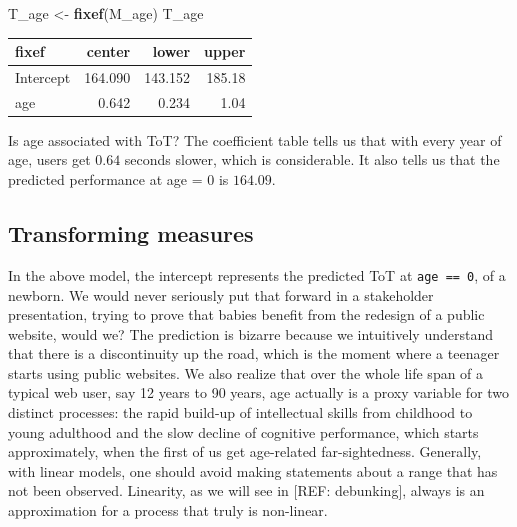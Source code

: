 \documentclass[]{svmono}
\newenvironment{Shaded}{\begin{snugshade}}{\end{snugshade}}
\newcommand{\KeywordTok}[1]{\textcolor[rgb]{0.13,0.29,0.53}{\textbf{#1}}}
\newcommand{\DataTypeTok}[1]{\textcolor[rgb]{0.13,0.29,0.53}{#1}}
\newcommand{\DecValTok}[1]{\textcolor[rgb]{0.00,0.00,0.81}{#1}}
\newcommand{\StringTok}[1]{\textcolor[rgb]{0.31,0.60,0.02}{#1}}
\newcommand{\OperatorTok}[1]{\textcolor[rgb]{0.81,0.36,0.00}{\textbf{#1}}}
\newcommand{\NormalTok}[1]{#1}
\begin{document}
\begin{Shaded}
\end{Shaded}

\begin{Shaded}
\begin{Highlighting}[]
\NormalTok{T_age <-}\StringTok{ }\KeywordTok{fixef}\NormalTok{(M_age)}
\NormalTok{T_age}
\end{Highlighting}
\end{Shaded}

\begin{longtable}[]{@{}lrrr@{}}
\toprule
fixef & center & lower & upper\tabularnewline
\midrule
\endhead
Intercept & 164.090 & 143.152 & 185.18\tabularnewline
age & 0.642 & 0.234 & 1.04\tabularnewline
\bottomrule
\end{longtable}

Is age associated with ToT? The coefficient table tells us that with
every year of age, users get \(0.64\) seconds slower, which is
considerable. It also tells us that the predicted performance at age = 0
is \(164.09\).

\subsection{Transforming measures}\label{transforming-measures}

In the above model, the intercept represents the predicted ToT at
\texttt{age\ ==\ 0}, of a newborn. We would never seriously put that
forward in a stakeholder presentation, trying to prove that babies
benefit from the redesign of a public website, would we? The prediction
is bizarre because we intuitively understand that there is a
discontinuity up the road, which is the moment where a teenager starts
using public websites. We also realize that over the whole life span of
a typical web user, say 12 years to 90 years, age actually is a proxy
variable for two distinct processes: the rapid build-up of intellectual
skills from childhood to young adulthood and the slow decline of
cognitive performance, which starts approximately, when the first of us
get age-related far-sightedness. Generally, with linear models, one
should avoid making statements about a range that has not been observed.
Linearity, as we will see in {[}REF: debunking{]}, always is an
approximation for a process that truly is non-linear.
\end{document}
